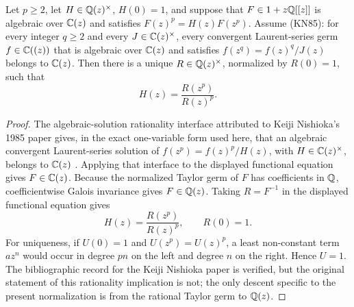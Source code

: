\begin{proposition}
\label{prop:algebraic-mahler-coboundary}
Let \(p\ge2\), let \(H\in\mathbb{Q}(z)^\times\), \(H(0)=1\), and suppose that
\(F\in1+z\mathbb{Q}[[z]]\) is algebraic over \(\mathbb{C}(z)\) and satisfies
\(F(z)^p=H(z)F(z^p)\).  Assume \textup{(KN85)}: for every integer
\(q\ge2\) and every \(J\in\mathbb{C}(z)^\times\), every convergent Laurent-series
germ \(f\in\mathbb{C}((z))\) that is algebraic over \(\mathbb{C}(z)\) and satisfies
\(f(z^q)=f(z)^q/J(z)\) belongs to \(\mathbb{C}(z)\).  Then there is a unique
\(R\in\mathbb{Q}(z)^\times\), normalized by \(R(0)=1\), such that
\begin{equation}\label{eq:general-rational-mahler-coboundary}
 H(z)=\frac{R(z^p)}{R(z)^p}.
\end{equation}
\end{proposition}

\begin{proof}
The algebraic-solution rationality interface attributed to Keiji Nishioka's
1985 paper gives, in the exact one-variable form used here, that an algebraic
convergent Laurent-series solution of \(f(z^p)=f(z)^p/H(z)\), with
\(H\in\mathbb{C}(z)^\times\), belongs to \(\mathbb{C}(z)\)
\cite{Nishioka1985AlgebraicSolutions}.  Applying that interface to the
displayed functional equation gives \(F\in\mathbb{C}(z)\).
Because the normalized Taylor germ of \(F\) has coefficients in \(\mathbb{Q}\),
coefficientwise Galois invariance gives \(F\in\mathbb{Q}(z)\).  Taking
\(R=F^{-1}\) in the displayed functional equation gives
\[
 H(z)=\frac{R(z^p)}{R(z)^p},\qquad R(0)=1.
\]
For uniqueness, if \(U(0)=1\) and \(U(z^p)=U(z)^p\), a least non-constant
term \(az^n\) would occur in degree \(pn\) on the left and degree \(n\) on
the right.  Hence \(U=1\).  The bibliographic record for the Keiji Nishioka
paper is verified, but the original statement of this rationality implication
is not; the only descent specific to the present normalization is from the
rational Taylor germ to \(\mathbb{Q}(z)\).
\end{proof}


